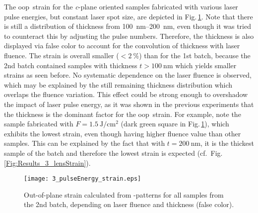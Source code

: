 The \gls{oop}\ strain for the \textit{c}-plane oriented samples fabricated with various laser pulse energies, but constant laser spot size, are depicted in Fig.\,\ref{Fig:Results_3_pulseStrain}.
Note that there is still a distribution of thickness from \qtyrange{100}{200}{\nm}, even though it was tried to counteract this by adjusting the pulse numbers.
Therefore, the thickness is also displayed via false color to account for the convolution of thickness with laser fluence.
The strain is overall smaller ($<\qty{2}{\percent}$) than for the 1st batch, because the 2nd batch contained samples with thickness $t>\qty{100}{\nm}$ which yields smaller strains as seen before.
No systematic dependence on the laser fluence is observed, which may be explained by the still remaining thickness distribution which overlaps the fluence variation.
This effect could be strong enough to overshadow the impact of laser pulse energy, as it was shown in the previous experiments that the thickness is the dominant factor for the \gls{oop}\ strain.
For example, note the sample fabricated with $F=\qty{1.5}{\J\per\cm\squared}$ (dark green square in Fig.\,\ref{Fig:Results_3_pulseStrain}), which exhibits the lowest strain, even though having higher fluence value than other samples.
This can be explained by the fact that with $t=\qty{200}{\nm}$, it is the thickest sample of the batch and therefore the lowest strain is expected (cf.\ Fig.\,\ref{Fig:Results_3_lensStrain}).
\begin{figure}
    \centering
    \texttt{[image: 3\_pulseEnergy\_strain.eps]}
    \caption{
        Out-of-plane strain calculated from \thetaomega-patterns for all samples from the 2nd batch, depending on laser fluence and thickness (false color).
    }
    \label{Fig:Results_3_pulseStrain}
\end{figure}

